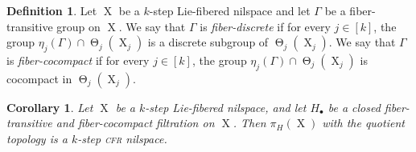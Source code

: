 \documentclass[a4paper,12pt,reqno]{amsart}
\newtheorem{corollary}[theorem]{Corollary}
\theoremstyle{definition}
\newtheorem{defn}[theorem]{Definition}
\DeclareMathOperator{\tran}{\Theta}
\DeclareMathOperator{\ns}{X}
\begin{document}
\begin{defn}\label{def:FDCA-general}
Let $\ns$ be a $k$-step Lie-fibered nilspace and let $\Gamma$ be a fiber-transitive group on $\ns$. We say that $\Gamma$ is \emph{fiber-discrete} if for every $j\in[k]$, the group $\eta_j(\Gamma)\cap \tran_j(\ns_j)$ is a discrete subgroup of $\tran_j(\ns_j)$. We say that $\Gamma$ is \emph{fiber-cocompact} if for every $j\in[k]$, the group $\eta_j(\Gamma)\cap \tran_j(\ns_j)$ is cocompact in $\tran_j(\ns_j)$.
\end{defn}

\begin{corollary}\label{cor:quo-cfr-nil}
Let $\ns$ be a $k$-step Lie-fibered nilspace, and let $H_\bullet$ be a closed fiber-transitive and fiber-cocompact filtration on $\ns$. Then $\pi_H(\ns)$ with the quotient topology is a $k$-step \textsc{cfr} nilspace.
\end{corollary}
\end{document}

